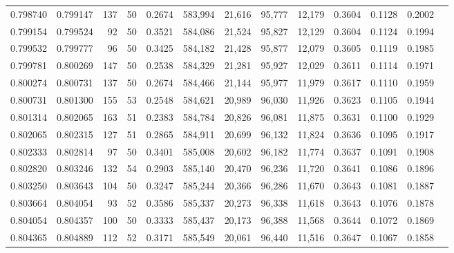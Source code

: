 \begin{tabular}{rrrrrrrrrrrrr}
0.798740 & 0.799147 &   137 &  50 &                                     0.2674 & 583,994 &  21,616 &  95,777 &  12,179 & 0.3604 & 0.1128 & 0.2002 \\
0.799154 & 0.799524 &    92 &  50 &                                     0.3521 & 584,086 &  21,524 &  95,827 &  12,129 & 0.3604 & 0.1124 & 0.1994 \\
0.799532 & 0.799777 &    96 &  50 &                                     0.3425 & 584,182 &  21,428 &  95,877 &  12,079 & 0.3605 & 0.1119 & 0.1985 \\
0.799781 & 0.800269 &   147 &  50 &                                     0.2538 & 584,329 &  21,281 &  95,927 &  12,029 & 0.3611 & 0.1114 & 0.1971 \\
0.800274 & 0.800731 &   137 &  50 &                                     0.2674 & 584,466 &  21,144 &  95,977 &  11,979 & 0.3617 & 0.1110 & 0.1959 \\
0.800731 & 0.801300 &   155 &  53 &                                     0.2548 & 584,621 &  20,989 &  96,030 &  11,926 & 0.3623 & 0.1105 & 0.1944 \\
0.801314 & 0.802065 &   163 &  51 &                                     0.2383 & 584,784 &  20,826 &  96,081 &  11,875 & 0.3631 & 0.1100 & 0.1929 \\
0.802065 & 0.802315 &   127 &  51 &                                     0.2865 & 584,911 &  20,699 &  96,132 &  11,824 & 0.3636 & 0.1095 & 0.1917 \\
0.802333 & 0.802814 &    97 &  50 &                                     0.3401 & 585,008 &  20,602 &  96,182 &  11,774 & 0.3637 & 0.1091 & 0.1908 \\
0.802820 & 0.803246 &   132 &  54 &                                     0.2903 & 585,140 &  20,470 &  96,236 &  11,720 & 0.3641 & 0.1086 & 0.1896 \\
0.803250 & 0.803643 &   104 &  50 &                                     0.3247 & 585,244 &  20,366 &  96,286 &  11,670 & 0.3643 & 0.1081 & 0.1887 \\
0.803664 & 0.804054 &    93 &  52 &                                     0.3586 & 585,337 &  20,273 &  96,338 &  11,618 & 0.3643 & 0.1076 & 0.1878 \\
0.804054 & 0.804357 &   100 &  50 &                                     0.3333 & 585,437 &  20,173 &  96,388 &  11,568 & 0.3644 & 0.1072 & 0.1869 \\
0.804365 & 0.804889 &   112 &  52 &                                     0.3171 & 585,549 &  20,061 &  96,440 &  11,516 & 0.3647 & 0.1067 & 0.1858 \\

\end{tabular}
